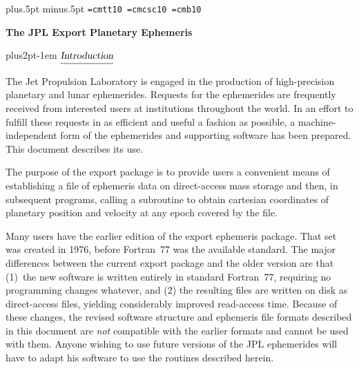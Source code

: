 \vspace{10mm}


\parindent=0pt\parskip=8pt
 plus.5pt minus.5pt
\lineskiplimit=1pt\lineskip=1pt
\font\tt=cmtt10
\font\csc=cmcsc10
\font\bld=cmb10
\newcount\inum
\def\vp{\vskip\parskip}
\def\pf{\par\filbreak}
\def\el{\hfill\break}
\def\itm#1{\leavevmode\hangindent.75truein\hangafter=1
\advance\inum by 1
\hbox to2em{\rm\hfil\number\inum. }#1\vadjust{\kern5pt}\el}
\def\ul#1{$\underline{\hbox{\sl\strut#1}}$}
\def\hdg#1{\vskip4pt plus2pt\leavevmode\kern-1em \ul{#1}\par}
\centerline{\bf The JPL Export Planetary Ephemeris}
\vskip2pt
\hdg{Introduction}
The Jet Propulsion Laboratory is engaged in the production of
high-precision planetary and lunar ephemerides. Requests
for the ephemerides are frequently received
from interested users at institutions throughout the world.
In an effort to fulfill these requests in as efficient and
useful a fashion as possible, a machine-independent form of the
ephemerides and supporting software has been prepared.
This document describes its use.
 
The purpose of the export package is to provide users a convenient
means of establishing a file of ephemeris data on direct-access
mass storage and then, in subsequent programs,
calling a subroutine to obtain cartesian
coordinates of planetary position and velocity at any epoch covered
by the file.
 
Many users have the earlier edition of the export ephemeris
package. That set was created in 1976, before Fortran~77 was
the available standard.
The major differences between the current export package and
the older version are that (1)~the new software is
written entirely in standard Fortran~77, requiring no programming changes
whatever, and (2) the resulting files are written on disk as
direct-access files, yielding considerably improved read-access time.
Because of these changes,
the revised software structure and ephemeris
file formats described in this document are {\it not\/} compatible
with the earlier formats and cannot be used with them.
Anyone wishing to use future versions of the JPL ephemerides
will have to adapt his software to use the routines described
herein.
 
